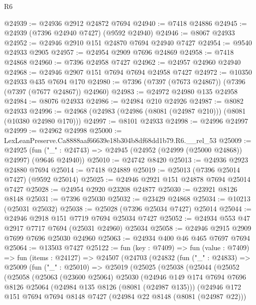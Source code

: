 \begin{lexlean}{R6}
\begin{coremodule}
@24939 := @24936 @2912 @24872 @7694
@24940 := @7418 @24886
@24945 := @24939 (@7396 @24940 @7427) (@9592 @24940)
@24946 := @8067 @24933
@24952 := @24946 @2910 @151 @24870 @7694 @24940 @7427
@24954 := @9540 @24933 @2905
@24957 := @24954 @2909 @7696 @24869
@24958 := @7418 @24868
@24960 := @7396 @24958 @7427
@24962 := @24957 @24960 @24940
@24968 := @24946 @2907 @151 @7694 @7694 @24958 @7427
@24972 := @10350 @24933 @435 @7694 @170
@24980 := @7396 (@7397 (@7673 @24867)) (@7396 (@7397 (@7677 @24867)) @24960)
@24983 := @24972 @24980 @135 @24958
@24984 := @8076 @24933
@24986 := @24984 @210 @24926
@24987 := @8082 @24933
@24996 := @24968 (@24983 (@24986 (@8081 (@24987 @210))) (@8081 (@10380 @24980 @170)))
@24997 := @8101 @24933
@24998 := @24996 @24997
@24999 := @24962 @24998
@25000 := LexLeanPreserve.Ca8888aaf66639e18b304b8df68dd1b79.R6.__rel_53
@25009 := @24925
    (fun ("_" : @24743) => @24945 (@24952 (@24999 (@25000 @24868)) @24997) (@9646 @24940))
@25010 := @24742 @8420
@25013 := @24936 @2923 @24880 @7694
@25014 := @7418 @24889
@25019 := @25013 (@7396 @25014 @7427) (@9592 @25014)
@25025 := @24946 @2921 @151 @24878 @7694 @25014 @7427
@25028 := @24954 @2920 @23208 @24877
@25030 := @23921 @8126 @8148
@25031 := @7396 @25030
@25032 := @23429 @24868
@25034 := @10213 (@25031 @25032)
@25038 := @25028 (@7396 @25034 @7427) @25014
@25044 := @24946 @2918 @151 @7719 @7694 @25034 @7427
@25052 := @24934 @553 @47 @2917 @7717 @7694 (@25031 @24960) @25034
@25058 := @24946 @2915 @2909 @7699 @7696 @25030 @24960
@25063 := @24934 @400 @46 @465 @7697 @7694
@25064 := @13503 @7427
@25122 := fun (key : @7409) =>
  fun (value : @7409) =>
  fun (items : @24127) =>
  @24507
    (@24703
      (@24832
        (fun ("_" : @24833) =>
        @25009
          (fun ("_" : @25010) =>
          @25019
            (@25025
              (@25038
                (@25044
                  (@25052
                    (@25058
                      (@25063
                        (@23600 @25064)
                        @25030
                        (@24946
                          @149
                          @174
                          @7694
                          @7696
                          @8126
                          @25064
                          (@24984 @135 @8126 (@8081 (@24987 @135)))
                          (@24946
                            @172
                            @151
                            @7694
                            @7694
                            @8148
                            @7427
                            (@24984 @22 @8148 (@8081 (@24987 @22)))

\end{coremodule}
\end{lexlean}
